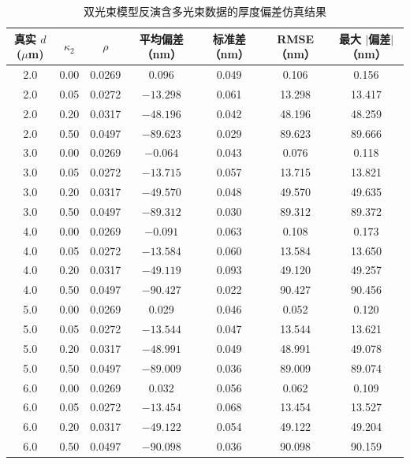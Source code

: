 \documentclass[withoutpreface,bwprint]{cumcmthesis}
\begin{document}
\begin{table}[H]
    \centering
    \caption{双光束模型反演含多光束数据的厚度偏差仿真结果}
    \label{tab:q3-sim}
    \small
    \begin{tabular}{ccccccc}
        \toprule
        真实 $d$ ($\mu$m) & $\kappa_2$ & $\rho$ & 平均偏差（nm） & 标准差（nm） & RMSE（nm） & 最大 $|$偏差$|$（nm） \\
        \midrule
        2.0 & 0.00 & 0.0269 & 0.096 & 0.049 & 0.106 & 0.156 \\
        2.0 & 0.05 & 0.0272 & $-13.298$ & 0.061 & 13.298 & 13.417 \\
        2.0 & 0.20 & 0.0317 & $-48.196$ & 0.042 & 48.196 & 48.259 \\
        2.0 & 0.50 & 0.0497 & $-89.623$ & 0.029 & 89.623 & 89.666 \\
        3.0 & 0.00 & 0.0269 & $-0.064$ & 0.043 & 0.076 & 0.118 \\
        3.0 & 0.05 & 0.0272 & $-13.715$ & 0.057 & 13.715 & 13.821 \\
        3.0 & 0.20 & 0.0317 & $-49.570$ & 0.048 & 49.570 & 49.635 \\
        3.0 & 0.50 & 0.0497 & $-89.312$ & 0.030 & 89.312 & 89.372 \\
        4.0 & 0.00 & 0.0269 & $-0.091$ & 0.063 & 0.108 & 0.173 \\
        4.0 & 0.05 & 0.0272 & $-13.584$ & 0.060 & 13.584 & 13.650 \\
        4.0 & 0.20 & 0.0317 & $-49.119$ & 0.093 & 49.120 & 49.257 \\
        4.0 & 0.50 & 0.0497 & $-90.427$ & 0.022 & 90.427 & 90.456 \\
        5.0 & 0.00 & 0.0269 & 0.029 & 0.046 & 0.052 & 0.120 \\
        5.0 & 0.05 & 0.0272 & $-13.544$ & 0.047 & 13.544 & 13.621 \\
        5.0 & 0.20 & 0.0317 & $-48.991$ & 0.049 & 48.991 & 49.078 \\
        5.0 & 0.50 & 0.0497 & $-89.009$ & 0.036 & 89.009 & 89.074 \\
        6.0 & 0.00 & 0.0269 & 0.032 & 0.056 & 0.062 & 0.109 \\
        6.0 & 0.05 & 0.0272 & $-13.454$ & 0.068 & 13.454 & 13.527 \\
        6.0 & 0.20 & 0.0317 & $-49.122$ & 0.054 & 49.122 & 49.204 \\
        6.0 & 0.50 & 0.0497 & $-90.098$ & 0.036 & 90.098 & 90.159 \\
        \bottomrule
    \end{tabular}
\end{table}
\end{document}

